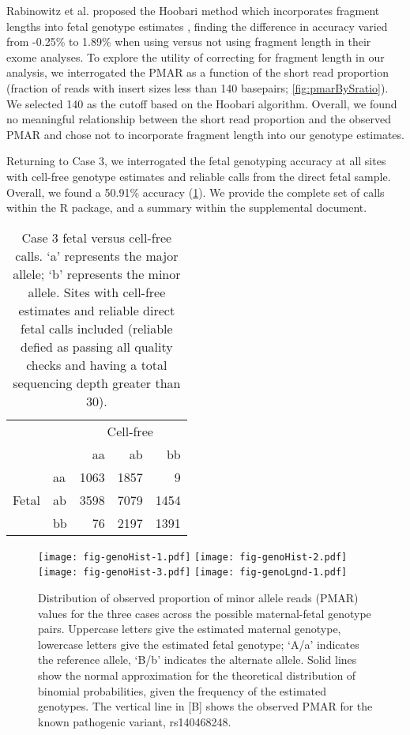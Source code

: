 \documentclass{article}\usepackage[]{graphicx}\usepackage[]{color}
\begin{document}
Rabinowitz et al. proposed the Hoobari method which incorporates fragment lengths into fetal genotype estimates \cite{rabinowitz:2019aa}, finding the difference in accuracy varied from -0.25\% to 1.89\% when using versus not using fragment length in their exome analyses.
To explore the utility of correcting for fragment length in our analysis, we interrogated the PMAR as a function of the short read proportion (fraction of reads with insert sizes less than 140 basepairs; \cref{fig:pmarBySratio}).
We selected 140 as the cutoff based on the Hoobari algorithm.
Overall, we found no meaningful relationship between the short read proportion and the observed PMAR and chose not to incorporate fragment length into our genotype estimates.

Returning to Case 3, we interrogated the fetal genotyping accuracy at all sites with cell-free genotype estimates and reliable calls from the direct fetal sample.
Overall, we found a 50.91\% accuracy (\cref{tab:c3calls}).
We provide the complete set of calls within the R package, and a summary within the supplemental document.

\begin{table}
  \centering
  \begin{tabular}{llrrr}
  \toprule
   & & \multicolumn{3}{c}{Cell-free} \\
   & & aa & ab & bb \\
   \midrule
   \multirow{3}{*}{Fetal} & aa & 1063 & 1857 & 9 \\
   & ab & 3598 & 7079 & 1454 \\
   & bb & 76 & 2197 & 1391 \\
  \bottomrule
  \end{tabular}
  \caption{Case 3 fetal versus cell-free calls. `a' represents the major allele; `b' represents the minor allele. Sites with cell-free estimates and reliable direct fetal calls included (reliable defied as passing all quality checks and having a total sequencing depth greater than 30).}
  \label{tab:c3calls}
\end{table}

\begin{figure}
  \centering
  \texttt{[image: fig-genoHist-1.pdf]}%
  \texttt{[image: fig-genoHist-2.pdf]}%
  \texttt{[image: fig-genoHist-3.pdf]}
  \texttt{[image: fig-genoLgnd-1.pdf]}
  \caption{Distribution of observed proportion of minor allele reads (PMAR) values for the three cases across the possible maternal-fetal genotype pairs. Uppercase letters give the estimated maternal genotype, lowercase letters give the estimated fetal genotype; `A/a' indicates the reference allele, `B/b' indicates the alternate allele. Solid lines show the normal approximation for the theoretical distribution of binomial probabilities, given the frequency of the estimated genotypes. The vertical line in [B] shows the observed PMAR for the known pathogenic variant, rs140468248.}
  \label{fig:genoHist}
\end{figure}
\end{document}
